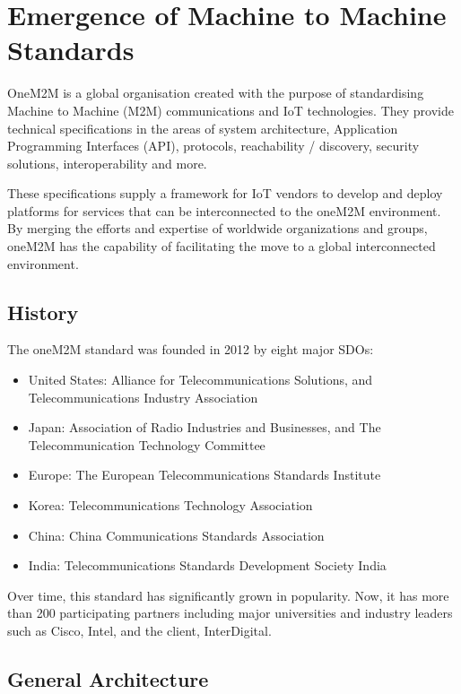 \section{Emergence of Machine to Machine Standards}

OneM2M is a global organisation created with the purpose of standardising Machine to Machine (M2M) communications and IoT technologies. They provide technical specifications in the areas of system architecture, Application Programming Interfaces (API), protocols, reachability / discovery, security solutions, interoperability and more.

These specifications supply a framework for IoT vendors to develop and deploy platforms for services that can be interconnected to the oneM2M environment. By merging the efforts and expertise of worldwide organizations and groups, oneM2M has the capability of facilitating the move to a global interconnected environment.

\subsection{History}

The oneM2M standard was founded in 2012 by eight major SDOs: 

\begin{itemize}
  \item United States: Alliance for Telecommunications Solutions, and Telecommunications Industry Association
  \item Japan: Association of Radio Industries and Businesses, and The Telecommunication Technology Committee
  \item Europe: The European Telecommunications Standards Institute
  \item Korea: Telecommunications Technology Association
  \item China: China Communications Standards Association
  \item India: Telecommunications Standards Development Society India
\end{itemize}

Over time, this standard has significantly grown in popularity. Now, it has more than 200 participating partners including major universities and industry leaders such as Cisco, Intel, and the client, InterDigital.

\subsection{General Architecture}

